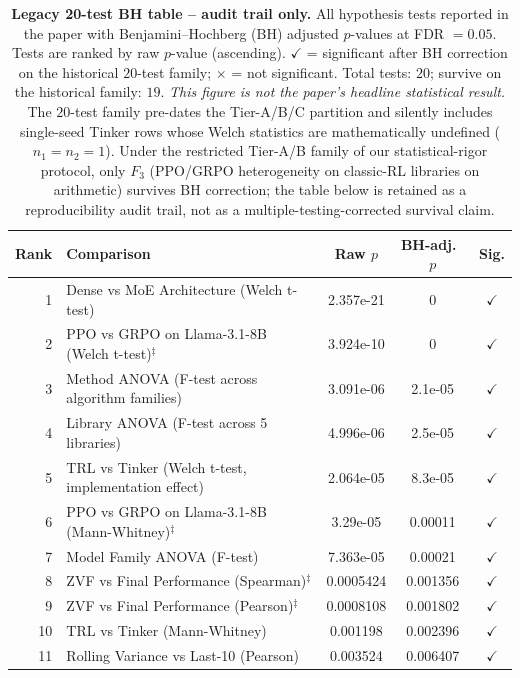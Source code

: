 \documentclass{article}  \usepackage[preprint,nonatbib]{neurips_2026} \usepackage[numbers]{natbib}
\begin{document}
\begin{table}[!ht]
\centering
\caption{\textbf{Legacy 20-test BH table -- audit trail only.} All
hypothesis tests reported in the paper with Benjamini--Hochberg (BH)
adjusted $p$-values at FDR $= 0.05$.  Tests are ranked by raw
$p$-value (ascending). $\checkmark$ = significant after BH correction
on the historical $20$-test family; $\times$ = not significant. Total
tests: $20$; survive on the historical family: $19$. \emph{This
figure is not the paper's headline statistical result.} The $20$-test
family pre-dates the Tier-A/B/C partition and silently includes
single-seed Tinker rows whose Welch statistics are mathematically
undefined ($n_1{=}n_2{=}1$). Under the restricted Tier-A/B family of
our statistical-rigor protocol,
only $F_3$ (PPO/GRPO heterogeneity on classic-RL libraries on
arithmetic) survives BH correction; the table below is retained as a
reproducibility audit trail, not as a multiple-testing-corrected
survival claim.}
\label{tab:bh-pvalues}
\scriptsize
\begin{tabular}{@{}rp{6.2cm}ccc@{}}
\toprule
Rank & Comparison & Raw $p$ & BH-adj.\ $p$ & Sig. \\
\midrule
        1 & Dense vs MoE Architecture (Welch t-test) & 2.357e-21 & 0 & $\checkmark$ \\
        2 & PPO vs GRPO on Llama-3.1-8B (Welch t-test)$^{\ddag}$ & 3.924e-10 & 0 & $\checkmark$ \\
        3 & Method ANOVA (F-test across algorithm families) & 3.091e-06 & 2.1e-05 & $\checkmark$ \\
        4 & Library ANOVA (F-test across 5 libraries) & 4.996e-06 & 2.5e-05 & $\checkmark$ \\
        5 & TRL vs Tinker (Welch t-test, implementation effect) & 2.064e-05 & 8.3e-05 & $\checkmark$ \\
        6 & PPO vs GRPO on Llama-3.1-8B (Mann-Whitney)$^{\ddag}$ & 3.29e-05 & 0.00011 & $\checkmark$ \\
        7 & Model Family ANOVA (F-test) & 7.363e-05 & 0.00021 & $\checkmark$ \\
        8 & ZVF vs Final Performance (Spearman)$^{\ddag}$ & 0.0005424 & 0.001356 & $\checkmark$ \\
        9 & ZVF vs Final Performance (Pearson)$^{\ddag}$ & 0.0008108 & 0.001802 & $\checkmark$ \\
        10 & TRL vs Tinker (Mann-Whitney) & 0.001198 & 0.002396 & $\checkmark$ \\
        11 & Rolling Variance vs Last-10 (Pearson) & 0.003524 & 0.006407 & $\checkmark$ \\

\end{tabular}
\end{table}
\end{document}

